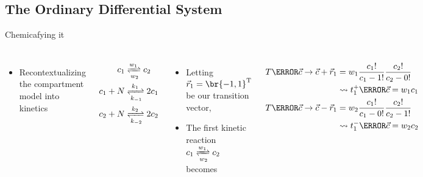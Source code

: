 \documentclass[aspectratio=169,  notheorems, sOuRcEs]{RUCPresentation}
\newcounter{reaction}
\begin{document}
\subsection{The Ordinary Differential System}

\begin{frame}{Chemicafying it}


    \begin{columns}[T]
        \begin{itemize}
            \item Recontextualizing the compartment model into kinetics
        \end{itemize}
        \begin{align*}
            c_1 &\xrightleftharpoons[w_2]{w_1} c_2 \\
            c_1 + N &\xrightleftharpoons[k_{-1}]{k_1} 2c_1\\
            c_2 + N &\xrightleftharpoons[k_{-2}]{k_2} 2c_2
        \end{align*}

        \begin{itemize}
            \item Letting  \(\vec{r}_1 = \br{-1,1}^{\mathrm{T}} \) be our transition vector,
            \item The first kinetic reaction \(c_1 \xrightleftharpoons[w_2]{w_1} c_2 \)
            becomes
        \end{itemize}
        \begin{align*}
                T\of{ \vec{c} \to \vec{c} + \vec{r}_1} &= w_1 {c_1!\over {c_1 - 1}!}{c_2!\over {c_2 - 0}!} \\
            &\leadsto t_1^+\of{\vec{c}} = w_1 c_1 \\
                T\of{ \vec{c} \to \vec{c} - \vec{r}_1} &= w_2 {c_1!\over {c_1 - 0}!}{c_2!\over {c_2 - 1}!} \\
            &\leadsto t_1^-\of{\vec{c}} = w_2 c_2
        \end{align*}

    \end{columns}

\end{frame}
\end{document}
